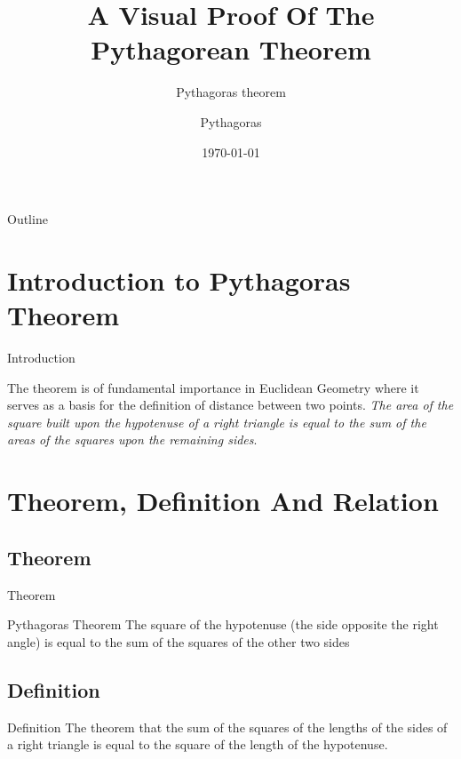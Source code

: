 \documentclass[10pt]{beamer}
\title[Pythagoras theorem]{A Visual Proof Of The Pythagorean Theorem}
\subtitle{Pythagoras theorem}
\author[Pythagoras of Samos]{Pythagoras}
\date{\today}
\begin{document}
\begin{frame}
	\titlepage			%
\end{frame}

\begin{frame}{Outline}
	\transfade
	\tableofcontents
\end{frame}

\section{Introduction to Pythagoras Theorem}

\begin{frame}{Introduction}
\label{sec:intro}

\transdissolve
The theorem is of fundamental importance in Euclidean Geometry where it serves 
as a basis for the definition of distance between two points.
\emph{The area of the square built upon the hypotenuse of a right
triangle is equal to the sum of the areas of the squares upon the
remaining sides}.
\end{frame}

\section{Theorem, Definition And Relation}
\label{sec:def}
\subsection{Theorem}
\begin{frame}{Theorem}
\begin{block}{Pythagoras Theorem}
\transfade
The square of the hypotenuse (the side opposite the right angle) is equal to the sum of the squares of the other two sides
\end{block}
\end{frame}

\subsection{Definition}
\begin{frame}{Definition}
\transfade
The theorem that the sum of the squares of the lengths of the sides of a right triangle is equal to the square of the length of the hypotenuse.
\end{frame}
\end{document}
